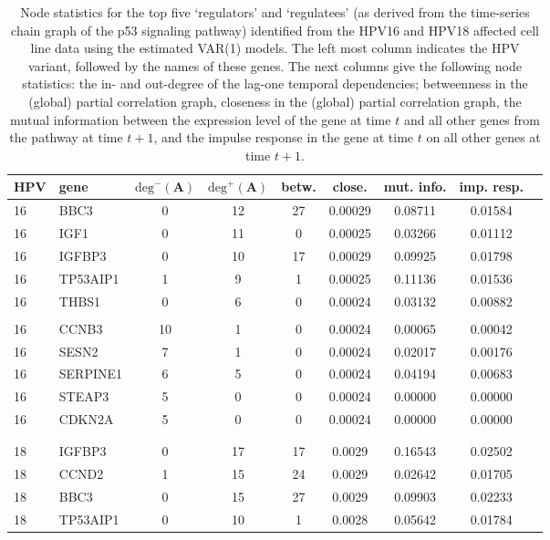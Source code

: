 {\begin{table}
\caption{Node statistics for the top five `regulators' and `regulatees' (as derived from the time-series chain graph of the p53 signaling pathway) identified from the HPV16 and HPV18 affected cell line data using the estimated VAR(1) models. The left most column indicates the HPV variant, followed by the names of these genes. The next columns give the following node statistics: the in- and out-degree of the lag-one temporal dependencies; betweenness in the (global) partial correlation graph, closeness in the (global) partial correlation graph, the mutual information between the expression level of the gene at time $t$ and all other genes from the pathway at time $t+1$, and the impulse response in the gene at time $t$ on all other genes at time $t+1$.}
\begin{tabular}{ll*{6}{c}r}
\hline
\hline          
HPV & gene & $\mbox{deg}^-(\mathbf{A})$ & $\mbox{deg}^+(\mathbf{A})$ & betw. & close. & mut. info. & imp. resp.  \\
\hline
16 & BBC3        & 0 & 12 & 27 & 0.00029 & 0.08711 & 0.01584
\\
16 & IGF1     & 0 & 11 & 0 & 0.00025 & 0.03266 & 0.01112
\\
16 & IGFBP3     & 0 & 10 & 17 & 0.00029 & 0.09925 & 0.01798
\\
16 & TP53AIP1     & 1 & 9 & 1 & 0.00025 & 0.11136 & 0.01536
\\
16 & THBS1     & 0 & 6 & 0 & 0.00024 & 0.03132 & 0.00882
\\
\\
16 & CCNB3    & 10 & 1 & 0 & 0.00024 & 0.00065 & 0.00042
\\
16 & SESN2        & 7 & 1 & 0 & 0.00024 & 0.02017 & 0.00176
\\
16 & SERPINE1       & 6 & 5 & 0 & 0.00024 & 0.04194 & 0.00683
\\
16 & STEAP3    & 5 & 0 & 0 & 0.00024 & 0.00000 & 0.00000
\\
16 & CDKN2A  & 5 & 0 & 0 & 0.00024 & 0.00000 & 0.00000
\\
\\
\\
18 & IGFBP3        & 0 & 17 & 17 & 0.0029 & 0.16543 & 0.02502
\\
18 & CCND2     & 1 & 15 & 24 & 0.0029 & 0.02642 & 0.01705
\\
18 & BBC3     & 0 & 15 & 27 & 0.0029 & 0.09903 & 0.02233
\\
18 & TP53AIP1     & 0 & 10 & 1 & 0.0028 & 0.05642 & 0.01784
\\

\end{tabular}
\end{table}}
